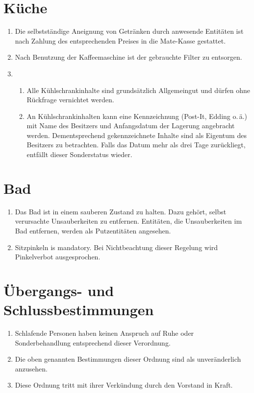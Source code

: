 \documentclass[12pt,a4paper]{scrartcl}
\begin{document}
\section{Küche}
\begin{enumerate}
  \item Die selbstständige Aneignung von Getränken durch anwesende Entitäten ist
    nach Zahlung des entsprechenden Preises in die Mate-Kasse gestattet.
  \item Nach Benutzung der Kaffeemaschine ist der gebrauchte Filter zu
    entsorgen.
  \item\begin{enumerate}
    \item Alle Kühlschrankinhalte sind grundsätzlich Allgemeingut und dürfen
      ohne Rückfrage vernichtet werden.
    \item An Kühlschrankinhalten kann eine Kennzeichnung (Post-It, Edding
      o.\,ä.) mit Name des Besitzers und Anfangsdatum der Lagerung
      angebracht werden. Dementsprechend gekennzeichnete Inhalte sind als
      Eigentum des Besitzers zu betrachten. Falls das Datum mehr als drei Tage
      zurückliegt, entfällt dieser Sonderstatus wieder.
  \end{enumerate}
\end{enumerate}

\section{Bad}
\begin{enumerate}
  \item Das Bad ist in einem sauberen Zustand zu halten. Dazu gehört, selbst
    verursachte Unsauberkeiten zu entfernen. Entitäten, die Unsauberkeiten im
    Bad entfernen, werden als Putzentitäten angesehen.

  \item Sitzpinkeln is mandatory. Bei Nichtbeachtung dieser Regelung wird
    Pinkelverbot ausgesprochen.
\end{enumerate}

\section{Übergangs- und Schlussbestimmungen}
\begin{enumerate}
  \item Schlafende Personen haben keinen Anspruch auf Ruhe oder Sonderbehandlung
    entsprechend dieser Verordnung.

  \item Die oben genannten Bestimmungen dieser Ordnung sind als unveränderlich
    anzusehen.

  \item Diese Ordnung tritt mit ihrer Verkündung durch den Vorstand in Kraft.
\end{enumerate}
\end{document}
